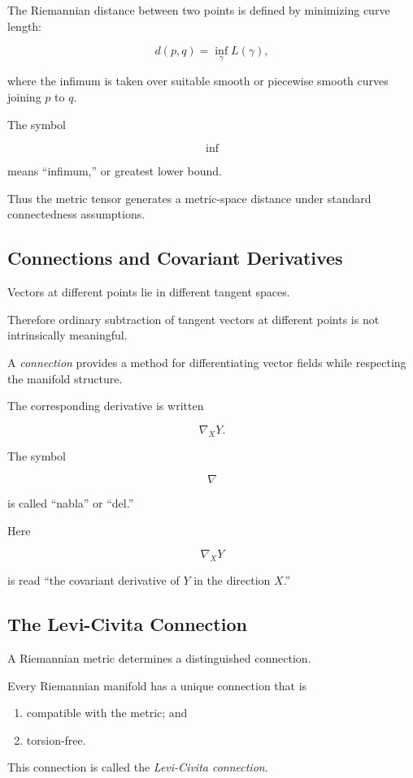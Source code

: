 The Riemannian distance between two points is defined by minimizing curve
length:

\[
\boxed{
d(p,q)
=
\inf_{\gamma}
L(\gamma),
}
\]

where the infimum is taken over suitable smooth or piecewise smooth curves
joining \(p\) to \(q\).

The symbol

\[
\inf
\]

means ``infimum,'' or greatest lower bound.

Thus the metric tensor generates a metric-space distance under standard
connectedness assumptions.

\subsection{Connections and Covariant Derivatives}
\label{subsec:connections-covariant-derivatives}

Vectors at different points lie in different tangent spaces.

Therefore ordinary subtraction of tangent vectors at different points is not
intrinsically meaningful.

A \emph{connection} provides a method for differentiating vector fields while
respecting the manifold structure.

The corresponding derivative is written

\[
\boxed{
\nabla_XY.
}
\]

The symbol

\[
\nabla
\]

is called ``nabla'' or ``del.''

Here

\[
\nabla_XY
\]

is read ``the covariant derivative of \(Y\) in the direction \(X\).''

\subsection{The Levi-Civita Connection}
\label{subsec:levi-civita-connection}

A Riemannian metric determines a distinguished connection.

\begin{theorem}
Every Riemannian manifold has a unique connection that is

\begin{enumerate}
    \item compatible with the metric; and
    \item torsion-free.
\end{enumerate}

This connection is called the \emph{Levi-Civita connection}.
\end{theorem}

